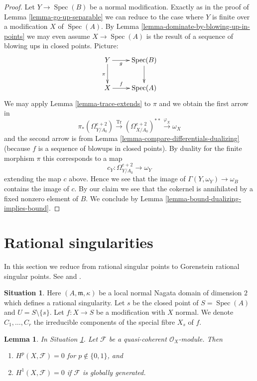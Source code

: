 \documentclass{stacks-project}
\theoremstyle{plain}
\newtheorem{lemma}[subsection]{Lemma}
\theoremstyle{definition}
\newtheorem{situation}[subsection]{Situation}
\theoremstyle{remark}
\numberwithin{equation}{subsection}
\def\Spec{\mathop{\mathrm{Spec}}}
\begin{document}
\begin{proof}
\medskip\noindent
Let $Y \to \Spec(B)$ be a normal modification. Exactly as in the proof of
Lemma \ref{lemma-go-up-separable} we can reduce to the case where $Y$
is finite over a modification $X$ of $\Spec(A)$. By
Lemma \ref{lemma-dominate-by-blowing-up-in-points} we may
even assume $X \to \Spec(A)$ is the result of a sequence of
blowing ups in closed points. Picture:
$$
\xymatrix{
Y \ar[d]_\pi \ar[r]_-g & \Spec(B) \ar[d] \\
X \ar[r]^-f & \Spec(A)
}
$$
We may apply Lemma \ref{lemma-trace-extends} to $\pi$ and
we obtain the first arrow in
$$
\pi_*(\Omega^{e + 2}_{Y/A_0})
\xrightarrow{\text{Tr}}
(\Omega^{e + 2}_{X/A_0})^{**}
\xrightarrow{\varphi_X}
\omega_X
$$
and the second arrow is from
Lemma \ref{lemma-compare-differentials-dualizing}
(because $f$ is a sequence of blowups in closed points).
By duality for the finite morphism $\pi$ this corresponds to a map
$$
c_Y : \Omega^{e + 2}_{Y/A_0} \longrightarrow \omega_Y
$$
extending the map $c$ above. Hence we see that the image of
$\Gamma(Y, \omega_Y) \to \omega_B$ contains the image of $c$.
By our claim we see that the cokernel is annihilated by
a fixed nonzero element of $B$. We conclude by
Lemma \ref{lemma-bound-dualizing-implies-bound}.
\end{proof}






\section{Rational singularities}
\label{section-rational-singularities}

\noindent
In this section we reduce from rational singular points to
Gorenstein rational singular points. See \cite{Lipman-rational} and
\cite{Mattuck}.

\begin{situation}
\label{situation-rational}
Here $(A, \mathfrak m, \kappa)$ be a local normal Nagata domain of
dimension $2$ which defines a rational singularity. Let $s$ be the closed
point of $S = \Spec(A)$ and $U = S \setminus \{s\}$. Let $f : X \to S$
be a modification with $X$ normal.
We denote $C_1, \ldots, C_r$ the irreducible
components of the special fibre $X_s$ of $f$.
\end{situation}

\begin{lemma}
\label{lemma-globally-generated}
In Situation \ref{situation-rational}.
Let $\mathcal{F}$ be a quasi-coherent $\mathcal{O}_X$-module. Then
\begin{enumerate}
\item $H^p(X, \mathcal{F}) = 0$ for $p \not \in \{0, 1\}$, and
\item $H^1(X, \mathcal{F}) = 0$ if $\mathcal{F}$ is globally generated.
\end{enumerate}
\end{lemma}
\end{document}
